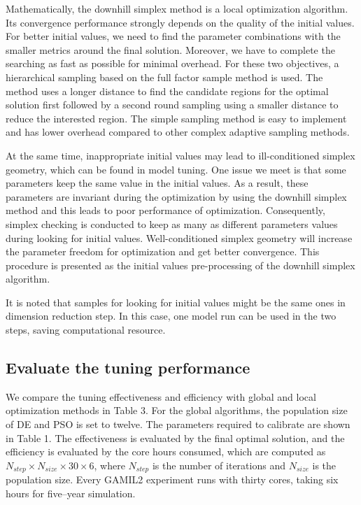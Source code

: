 \documentclass[gmd, manuscript]{copernicus}
\begin{document}
Mathematically, the downhill simplex method is a local optimization algorithm. Its convergence performance strongly depends on the quality of the initial values. For better initial values, we need to find the parameter combinations with the smaller metrics around the final solution. Moreover, we have to complete the searching as fast as possible for minimal overhead. For these two objectives, a hierarchical sampling based on the full factor sample method is used. The method uses a longer distance to find the candidate regions for the optimal solution first followed by a second round sampling using a smaller distance to reduce the interested region. The simple sampling method is easy to implement and has lower overhead compared to other complex adaptive sampling methods. 


At the same time, inappropriate initial values may lead to ill-conditioned simplex geometry, which can be found in model tuning. One issue we meet is that some parameters keep the same value in the initial values. As a result, these parameters are invariant during the optimization by using the downhill simplex method and this leads to poor performance of optimization. Consequently, simplex checking is conducted to keep as many as different parameters values during looking for initial values. Well-conditioned simplex geometry will increase the parameter freedom for optimization and get better convergence. This procedure is presented as the initial values pre-processing of the downhill simplex algorithm.


It is noted that samples for looking for initial values might be the same ones in dimension reduction step. In this case, one model run can be used in the two steps, saving computational resource.


\subsection{Evaluate the tuning performance}

We compare the tuning effectiveness and efficiency with global and local optimization methods in Table 3. For the global algorithms, the population size of DE and PSO is set to twelve. The parameters required to calibrate are shown in Table 1.   The effectiveness is evaluated by the final optimal solution, and the efficiency is evaluated by the core hours consumed, which are computed as $N_{step} \times N_{size} \times 30 \times 6$, where $N_{step}$ is the number of iterations and $N_{size}$ is the population size. Every GAMIL2 experiment runs with thirty cores, taking six hours for five–year simulation. 
\end{document}
